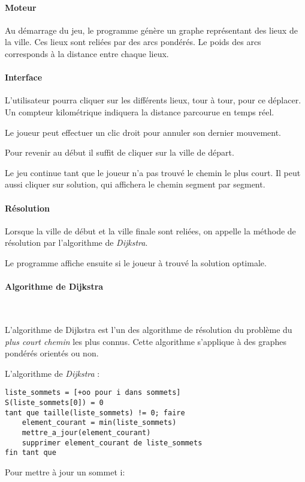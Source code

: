         \paragraph{Moteur}
            Au démarrage du jeu, le programme génère un graphe
            représentant des lieux de la ville. Ces lieux sont reliées par des arcs pondérés.
            Le poids des arcs corresponds à la distance entre chaque lieux.

        \paragraph{Interface}

        L'utilisateur pourra cliquer sur les différents lieux, tour à tour,
        pour ce déplacer. Un compteur kilométrique indiquera la
        distance parcourue en temps réel.

        Le joueur peut effectuer un clic droit pour annuler son dernier
        mouvement.

        Pour revenir au début il suffit de cliquer sur la ville de départ.

        Le jeu continue tant que le joueur n'a pas trouvé le chemin
        le plus court. Il peut aussi cliquer sur \og solution\fg, qui
        affichera le chemin segment par segment.

          

        \paragraph{Résolution}
            Lorsque la ville de début et la ville finale sont reliées,
            on appelle la méthode de résolution par l'algorithme de \emph{Dijkstra}.

            Le programme affiche ensuite si le joueur à trouvé la solution optimale.

		\paragraph{Algorithme de Dijkstra} ~
			
			L'algorithme de Dijkstra est l'un des algorithme de résolution du problème du 
			\emph{plus court chemin} les plus connus. Cette algorithme s'applique à des graphes pondérés orientés ou non.

			L'algorithme de \emph{Dijkstra} :
			\begin{lstlisting}
liste_sommets = [+oo pour i dans sommets]
S(liste_sommets[0]) = 0
tant que taille(liste_sommets) != 0; faire
    element_courant = min(liste_sommets)
    mettre_a_jour(element_courant)
    supprimer element_courant de liste_sommets
fin tant que
			\end{lstlisting}
			Pour mettre à jour un sommet i: 

